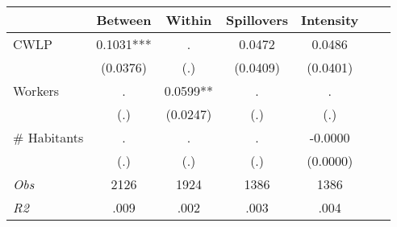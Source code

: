 \begin{tabular}{l*{6}{c}}\hline&\multicolumn{1}{c}{Between}&\multicolumn{1}{c}{Within}&\multicolumn{1}{c}{Spillovers}&\multicolumn{1}{c}{Intensity}\\ \hline 
CWLP & 0.1031*** & . & 0.0472 & 0.0486 \\
 & (0.0376) & (.) & (0.0409) & (0.0401) \\
Workers & . & 0.0599** & . & . \\
 & (.) & (0.0247) & (.) & (.) \\
\# Habitants & . & . & . & -0.0000 \\
  & (.) & (.) & (.) & (0.0000) \\
\hline \textit{Obs} & 2126 & 1924 & 1386 & 1386  \\ \textit{R2} & .009 & .002 & .003 & .004 \\ \hline \end{tabular}

